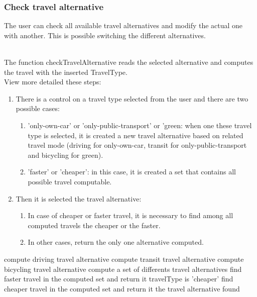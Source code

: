 \subsubsection{Check travel alternative}
The user can check all available travel alternatives and modify the actual one with another. This is possible switching the different alternatives.
\begin{figure}[!h]
	\centering
\end{figure}
\\The function checkTravelAlternative reads the selected alternative and computes the travel with the inserted TravelType.
\\View more detailed these steps:
\begin{enumerate}
	\item There is a control on a travel type selected from the user and there are two possible cases:
		\begin{enumerate}
			\item 'only-own-car' or 'only-public-transport' or 'green:
				when one these travel type is selected, it is created a new travel alternative based on related travel mode (driving for only-own-car, transit for only-public-transport and bicycling for green).
			\item 'faster' or 'cheaper':  in this case, it is created a set that contains all possible travel computable.
		\end{enumerate}
	\item Then it is selected the travel alternative:
		\begin{enumerate}
			\item In case of cheaper or faster travel, it is necessary to find among all computed travels the cheaper or the faster.
			\item In other cases, return the only one alternative computed.
		\end{enumerate}
\end{enumerate}

\begin{algorithmic}

		
			\State 	compute driving travel alternative
			\State 	compute transit travel alternative
			\State 	compute bicycling travel alternative
			\State 	compute a set of differents travel alternatives
		\EndIf
				\State find faster travel in the computed set and return it
			\EndIf
			\If travelType is 'cheaper'
				\State find cheaper travel in the computed set and return it
			\EndIf
			\State \Return the travel alternative found
		\EndIf
	\EndFunction
\end{algorithmic}

